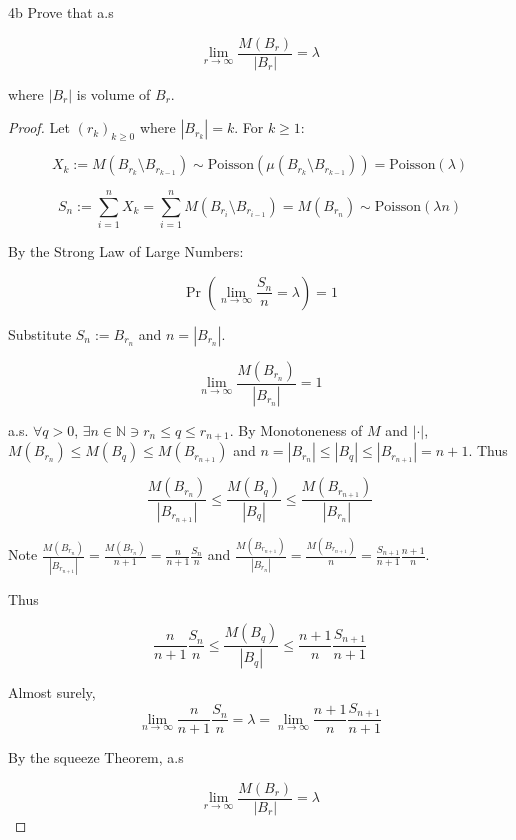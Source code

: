 \documentclass{article}
\newcommand{\N}{\mathbb{N}}
\newcommand{\abs}[1]{\left\lvert #1\right\rvert}
\newcommand{\Poi}[0]{\text{Poisson}}
\begin{document}
\begin{claim}{4b}\label{Claim 4b.}
    Prove that a.s 
    
    \[\lim_{r \to \infty} \frac{M(B_{r})}{\abs{B_{r}}} = \lambda \]

    where $\abs{B_r}$ is volume of $B_r$. 
\end{claim}
\begin{proof}
    Let $(r_k)_{k \geq 0}$ where $\abs{B_{r_k}} = k$. For $k \geq 1$: 
    
    \[X_{k} := M(B_{r_k} \setminus B_{r_{k - 1}}) \sim \Poi(\mu(B_{r_k} \setminus B_{r_{k - 1}})) = \Poi(\lambda)\]

    \[S_n := \sum_{i = 1}^{n} X_k = \sum_{i = 1}^n M(B_{r_i} \setminus B_{r_{i - 1}}) = M(B_{r_n}) \sim \Poi(\lambda n)\]

    By the Strong Law of Large Numbers:

    \[\Pr\left(\lim_{n \to \infty} \frac{S_n}{n} = \lambda \right) = 1\] 

    Substitute $S_n := B_{r_n}$ and $n = \abs{B_{r_n}}$.   

    \[\lim_{n \to \infty} \frac{M(B_{r_n})}{\abs{B_{r_n}}} = 1\]

    a.s. $\forall q > 0$, $\exists n \in \N \ni r_{n} \leq q \leq r_{n + 1}$. By Monotoneness of $M$ and $\abs{ \cdot }$, $M(B_{r_n}) \leq M(B_{q}) \leq M(B_{r_{n + 1}})$ and $n = \abs{B_{r_n}} \leq \abs{B_{q}} \leq \abs{B_{r_{n + 1}}} = n + 1$. Thus
    
    
    \[\frac{M(B_{r_n})}{\abs{B_{r_{n + 1}}}} \leq \frac{M(B_q)}{\abs{B_q}} \leq \frac{M(B_{r_{n + 1}})}{\abs{B_{r_n}}} \]

    Note $\frac{M(B_{r_n})}{\abs{B_{r_{n + 1}}}} = \frac{M(B_{r_n})}{n + 1} = \frac{n}{n + 1} \frac{S_n}{n}$ and $\frac{M(B_{r_{n + 1}})}{\abs{B_{r_n}}} = \frac{M(B_{r_{n + 1}})}{n} = \frac{S_{n+1}}{n + 1} \frac{n + 1}{n}$. 
    
    Thus 

    \[\frac{n}{n + 1} \frac{S_n}{n} \leq \frac{M(B_q)}{\abs{B_q}} \leq  \frac{n + 1}{n} \frac{S_{n+1}}{n + 1}\]

    Almost surely, 
    \[\lim_{n \to \infty} \frac{n}{n + 1} \frac{S_n}{n} = \lambda = \lim_{n \to \infty} \frac{n + 1}{n} \frac{S_{n+1}}{n + 1}\] 

    By the squeeze Theorem, a.s 
    
    \[\lim_{r \to \infty} \frac{M(B_{r})}{\abs{B_{r}}} = \lambda \]
\end{proof}
\end{document}
